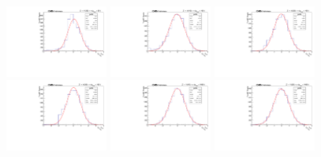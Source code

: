 \begin{figure}[!htbp]
\begin{center}
\includegraphics[width=0.3\textwidth]{figures/modeling_xchecks/plots/ZToUpsilon3SPhoton_Cat0_signalStrenght_50/pulls}
\includegraphics[width=0.3\textwidth]{figures/modeling_xchecks/plots/ZToUpsilon1SPhoton_Cat0_signalStrenght_100/pulls}
\includegraphics[width=0.3\textwidth]{figures/modeling_xchecks/plots/ZToUpsilon2SPhoton_Cat0_signalStrenght_100/pulls}
\includegraphics[width=0.3\textwidth]{figures/modeling_xchecks/plots/ZToUpsilon3SPhoton_Cat0_signalStrenght_100/pulls}
\includegraphics[width=0.3\textwidth]{figures/modeling_xchecks/plots/ZToUpsilon1SPhoton_Cat0_signalStrenght_1000/pulls}
\includegraphics[width=0.3\textwidth]{figures/modeling_xchecks/plots/ZToUpsilon2SPhoton_Cat0_signalStrenght_1000/pulls}

\end{center}
\end{figure}
